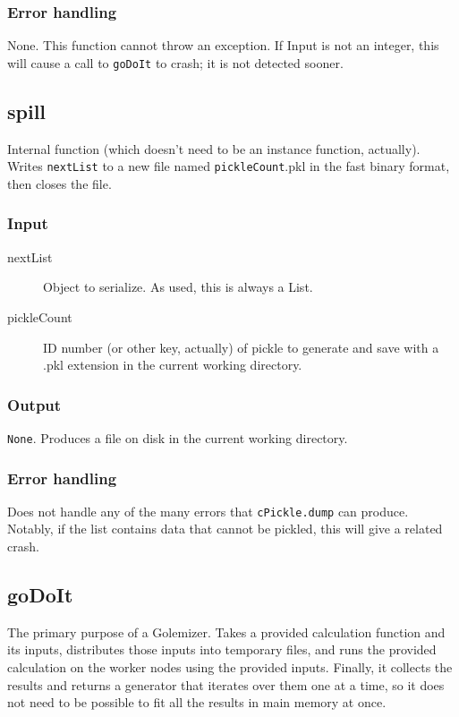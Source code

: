 \documentclass[11pt,ebook,oneside,final]{memoir} %
\begin{document}
\subsubsection*{Error handling}
None. This function cannot throw an exception. If Input is not an integer, this will cause a call to \texttt{goDoIt} to crash; it is not detected sooner.
\subsection{\textunderscore{}spill}
Internal function (which doesn't need to be an instance function, actually). Writes \texttt{nextList} to a new file named \texttt{pickleCount}.pkl in the fast binary format, then closes the file.
\subsubsection*{Input}
\begin{description}
	\item[nextList] Object to serialize. As used, this is always a List.
	\item[pickleCount] ID number (or other key, actually) of pickle to generate and save with a .pkl extension in the current working directory.
\end{description}
\subsubsection*{Output}
\texttt{None}. Produces a file on disk in the current working directory.
\subsubsection*{Error handling}
Does not handle any of the many errors that \texttt{cPickle.dump} can produce. Notably, if the list contains data that cannot be pickled, this will give a related crash.

\subsection{goDoIt}
The primary purpose of a Golemizer. Takes a provided calculation function and its inputs, distributes those inputs into temporary files, and runs the provided calculation on the worker nodes using the provided inputs. Finally, it collects the results and returns a generator that iterates over them one at a time, so it does not need to be possible to fit all the results in main memory at once.
\end{document}

